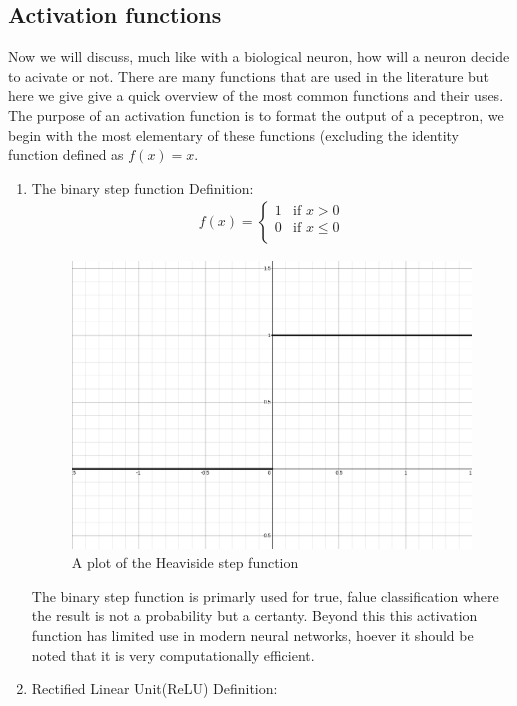 \documentclass{article}
\begin{document}
\subsection{Activation functions}
Now we will discuss, much like with a biological neuron, how will a neuron decide to acivate or not. There are many functions that are used in the literature but here we give give a quick overview of the most common functions and their uses. The purpose of an activation function is to format the output of a peceptron, we begin with the most elementary of these functions (excluding the identity function defined as $f(x) = x$. 
\begin{enumerate}
\item The binary step function 
Definition:
\begin{align*}
f(x) = 
\begin{cases}
 1 & \text{if } x > 0 \\
 0 & \text{if } x \leq 0 \\
\end{cases}
\end{align*}
\begin{figure}[H]
\caption{A plot of the Heaviside step function}
\includegraphics[scale=0.2]{heaviside.png}
\end{figure}
The binary step function is primarly used for true, falue classification where the result is not a probability but a certanty. Beyond this this activation function has limited use in modern neural networks, hoever it should be noted that it is very computationally efficient. 
\item Rectified Linear Unit(ReLU)
Definition: 
\begin{align*}

\end{align*}
\end{enumerate}
\end{document}
